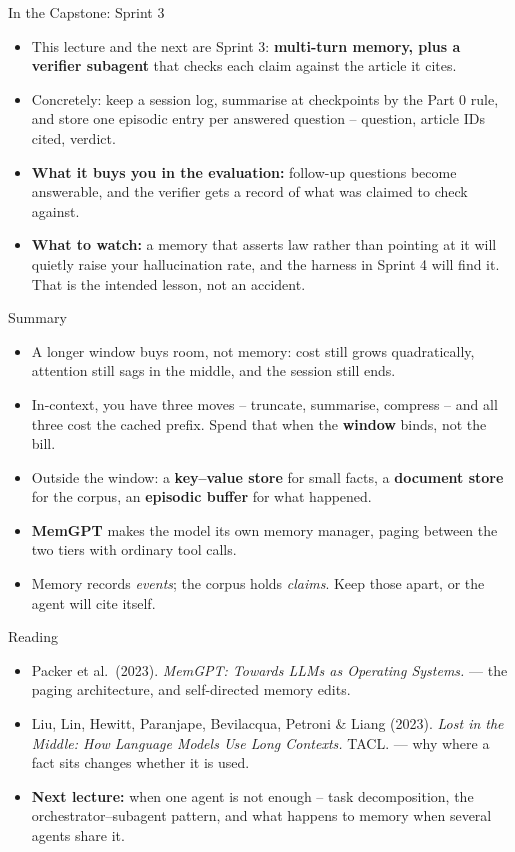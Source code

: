 \begin{frame}{In the Capstone: Sprint 3}
\begin{itemize}
  \item This lecture and the next are Sprint 3: \textbf{multi-turn memory, plus a verifier subagent} that checks each claim against the article it cites.
  \pause
  \item Concretely: keep a session log, summarise at checkpoints by the Part 0 rule, and store one episodic entry per answered question -- question, article IDs cited, verdict.
  \pause
  \item \textbf{What it buys you in the evaluation:} follow-up questions become answerable, and the verifier gets a record of what was claimed to check against.
  \pause
  \item \textbf{What to watch:} a memory that asserts law rather than pointing at it will quietly raise your hallucination rate, and the harness in Sprint 4 will find it. That is the intended lesson, not an accident.
\end{itemize}
\end{frame}

\begin{frame}{Summary}
\begin{itemize}
  \item A longer window buys room, not memory: cost still grows quadratically, attention still sags in the middle, and the session still ends.
  \pause
  \item In-context, you have three moves -- truncate, summarise, compress -- and all three cost the cached prefix. Spend that when the \textbf{window} binds, not the bill.
  \pause
  \item Outside the window: a \textbf{key--value store} for small facts, a \textbf{document store} for the corpus, an \textbf{episodic buffer} for what happened.
  \pause
  \item \textbf{MemGPT} makes the model its own memory manager, paging between the two tiers with ordinary tool calls.
  \pause
  \item Memory records \emph{events}; the corpus holds \emph{claims}. Keep those apart, or the agent will cite itself.
\end{itemize}
\end{frame}

\begin{frame}{Reading}
\begin{itemize}
  \item Packer et al.\ (2023). \textit{MemGPT: Towards LLMs as Operating Systems.} --- the paging architecture, and self-directed memory edits.
  \pause
  \item Liu, Lin, Hewitt, Paranjape, Bevilacqua, Petroni \& Liang (2023). \textit{Lost in the Middle: How Language Models Use Long Contexts.} TACL. --- why where a fact sits changes whether it is used.
  \pause
  \item \textbf{Next lecture:} when one agent is not enough -- task decomposition, the orchestrator--subagent pattern, and what happens to memory when several agents share it.
\end{itemize}
\end{frame}
